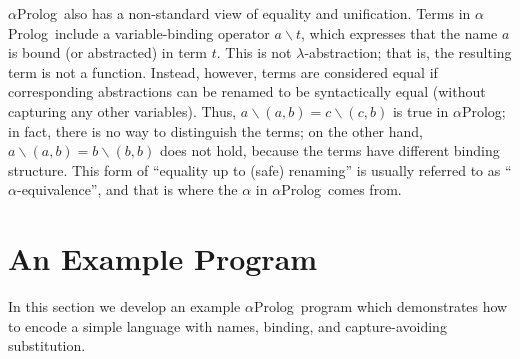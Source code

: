 \documentclass[draft,12pt]{report}
\newcommand{\aprolog}{$\alpha${Prolog}\xspace}
\begin{document}
\aprolog\ also has a non-standard view of equality and unification.
Terms in \aprolog\ include a variable-binding operator $a\backslash
t$, which expresses that the name $a$ is bound (or abstracted) in term
$t$.  This is not $\lambda$-abstraction; that is, the resulting term
is not a function.  Instead, however, terms are considered equal if
corresponding abstractions can be renamed to be syntactically equal
(without capturing any other variables).  Thus, $a \backslash (a,b) =
c \backslash (c,b)$ is true in \aprolog; in fact, there is no way to
distinguish the terms; on the other hand, $a \backslash (a,b) = b
\backslash(b,b)$ does not hold, because the terms have different
binding structure.  This form of ``equality up to (safe) renaming'' is
usually referred to as ``$\alpha$-equivalence'', and that is where the
$\alpha$ in \aprolog\ comes from.


\section{An Example Program}

In this section we develop an example \aprolog\ program which
demonstrates how to encode a simple language with names, binding, and
capture-avoiding substitution.
\end{document}
